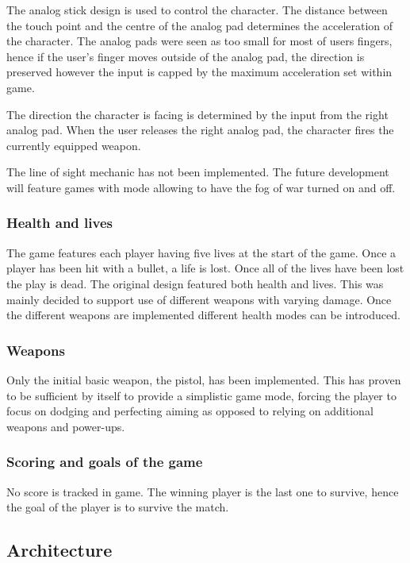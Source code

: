 \documentclass[11pt]{article} %
\begin{document}
The analog stick design is used to control the character. The distance between the touch point and the centre of the analog pad determines the acceleration of the character. The analog pads were seen as too small for most of users fingers, hence if the user's finger moves outside of the analog pad, the direction is preserved however the input is capped by the maximum acceleration set within game.

The direction the character is facing is determined by the input from the right analog pad. When the user releases the right analog pad, the character fires the currently equipped weapon.

The line of sight mechanic has not been implemented. The future development will feature games with mode allowing to have the fog of war turned on and off.

\subsubsection*{Health and lives}

The game features each player having five lives at the start of the game. Once a player has been hit with a bullet, a life is lost. Once all of the lives have been lost the play is dead. The original design featured both health and lives. This was mainly decided to support use of different weapons with varying damage. Once the different weapons are implemented different health modes can be introduced.

\subsubsection*{Weapons}

Only the initial basic weapon, the pistol, has been implemented. This has proven to be sufficient by itself to provide a simplistic game mode, forcing the player to focus on dodging and perfecting aiming as opposed to relying on additional weapons and power-ups.

\subsubsection*{Scoring and goals of the game}

No score is tracked in game. The winning player is the last one to survive, hence the goal of the player is to survive the match.

\subsection*{Architecture}
\end{document}
